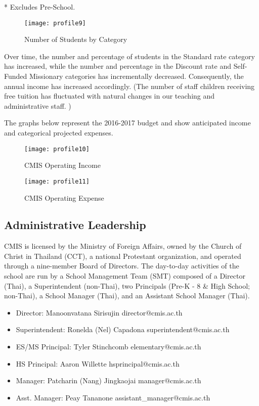 * Excludes Pre-School.  

\begin{figure}
\centering
\texttt{[image: profile9]}
\caption{Number of Students by Category}
\end{figure}

Over time, the number and percentage of students in the Standard rate category has increased, while the number and percentage in the Discount rate and Self-Funded Missionary categories has incrementally decreased.  Consequently, the annual income has increased accordingly.  (The number of staff children receiving free tuition has fluctuated with natural changes in our teaching and administrative staff. )  
 

The graphs below represent the 2016-2017 budget and show anticipated income and categorical projected expenses.  

\begin{figure}
\centering
\texttt{[image: profile10]}
\caption{CMIS Operating Income}
\end{figure}
\begin{figure}
\centering
\texttt{[image: profile11]}
\caption{CMIS Operating Expense}
\end{figure}


\subsection{Administrative Leadership}

CMIS is licensed by the Ministry of Foreign Affairs, owned by the Church of Christ in Thailand (CCT), a national Protestant organization, and operated through a nine-member Board of Directors.  The day-to-day activities of the school are run by a School Management Team (SMT) composed of a Director (Thai), a Superintendent (non-Thai), two Principals (Pre-K - 8 \& High School; non-Thai), a School Manager (Thai), and an Assistant School Manager (Thai). 

\begin{itemize}
\item Director:  Manoonvatana Sirisujin         		director@cmis.ac.th
\item Superintendent:  Ronelda (Nel) Capadona	superintendent@cmis.ac.th
\item ES/MS Principal:  Tyler Stinchcomb	     	elementary@cmis.ac.th
\item HS Principal:  Aaron Willette		   	hsprincipal@cmis.ac.th	
\item Manager:  Patcharin (Nang) Jingkaojai		manager@cmis.ac.th
\item Asst. Manager:  Peay Tananone			assistant\_manager@cmis.ac.th
\end{itemize}

